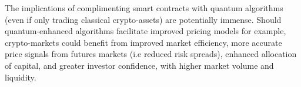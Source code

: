The implications of complimenting smart contracts with quantum algorithms (even if only trading classical crypto-assets) are potentially immense. Should quantum-enhanced algorithms facilitate improved pricing models for example, crypto-markets could benefit from improved market efficiency, more accurate price signals from futures markets (i.e reduced risk spreads), enhanced allocation of capital, and greater investor confidence, with higher market volume and liquidity.